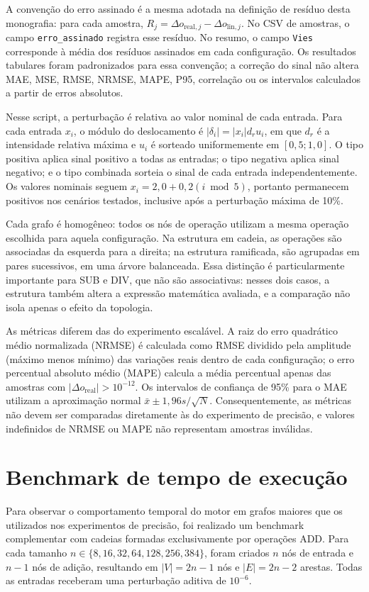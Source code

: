 \documentclass[12pt,openright,oneside,a4paper,brazil]{abntex2}
\begin{document}
A convenção do erro assinado é a mesma adotada na definição de resíduo desta monografia: para cada amostra, $R_j=\Delta o_{\mathrm{real},j}-\Delta o_{\mathrm{lin},j}$. No CSV de amostras, o campo \texttt{erro\_assinado} registra esse resíduo. No resumo, o campo \texttt{Vies} corresponde à média dos resíduos assinados em cada configuração. Os resultados tabulares foram padronizados para essa convenção; a correção do sinal não altera MAE, MSE, RMSE, NRMSE, MAPE, P95, correlação ou os intervalos calculados a partir de erros absolutos.

Nesse script, a perturbação é relativa ao valor nominal de cada entrada. Para cada entrada $x_i$, o módulo do deslocamento é $|\delta_i|=|x_i|d_r u_i$, em que $d_r$ é a intensidade relativa máxima e $u_i$ é sorteado uniformemente em $[0{,}5;1{,}0]$. O tipo positiva aplica sinal positivo a todas as entradas; o tipo negativa aplica sinal negativo; e o tipo combinada sorteia o sinal de cada entrada independentemente. Os valores nominais seguem $x_i=2{,}0+0{,}2(i\bmod 5)$, portanto permanecem positivos nos cenários testados, inclusive após a perturbação máxima de 10\%.

Cada grafo é homogêneo: todos os nós de operação utilizam a mesma operação escolhida para aquela configuração. Na estrutura em cadeia, as operações são associadas da esquerda para a direita; na estrutura ramificada, são agrupadas em pares sucessivos, em uma árvore balanceada. Essa distinção é particularmente importante para SUB e DIV, que não são associativas: nesses dois casos, a estrutura também altera a expressão matemática avaliada, e a comparação não isola apenas o efeito da topologia.

As métricas diferem das do experimento escalável. A raiz do erro quadrático médio normalizada (NRMSE) é calculada como RMSE dividido pela amplitude (máximo menos mínimo) das variações reais dentro de cada configuração; o erro percentual absoluto médio (MAPE) calcula a média percentual apenas das amostras com $|\Delta o_{\mathrm{real}}|>10^{-12}$. Os intervalos de confiança de 95\% para o MAE utilizam a aproximação normal $\bar{x}\pm1{,}96s/\sqrt{N}$. Consequentemente, as métricas não devem ser comparadas diretamente às do experimento de precisão, e valores indefinidos de NRMSE ou MAPE não representam amostras inválidas.

\section{Benchmark de tempo de execução}
Para observar o comportamento temporal do motor em grafos maiores que os utilizados nos experimentos de precisão, foi realizado um benchmark complementar com cadeias formadas exclusivamente por operações ADD. Para cada tamanho $n\in\{8,16,32,64,128,256,384\}$, foram criados $n$ nós de entrada e $n-1$ nós de adição, resultando em $|V|=2n-1$ nós e $|E|=2n-2$ arestas. Todas as entradas receberam uma perturbação aditiva de $10^{-6}$.
\end{document}

